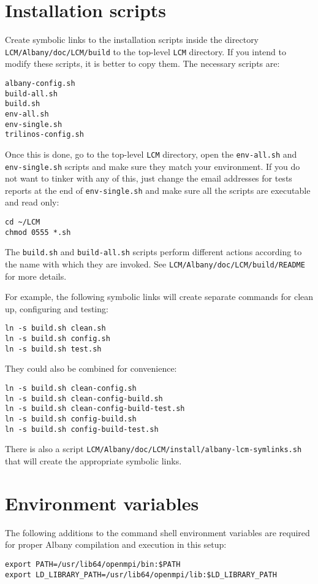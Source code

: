 \documentclass[10pt,a4paper]{article} \usepackage[utf8]{inputenc}
\begin{document}
\section{Installation scripts}
Create symbolic links to the installation scripts inside the directory
\verb+LCM/Albany/doc/LCM/build+ to the top-level \verb+LCM+
directory. If you intend to modify these scripts, it is better to copy
them. The necessary scripts are:
\begin{verbatim}
albany-config.sh
build-all.sh
build.sh
env-all.sh
env-single.sh
trilinos-config.sh
\end{verbatim}

Once this is done, go to the top-level \verb+LCM+ directory, open the
\verb+env-all.sh+ and \verb+env-single.sh+ scripts and make sure they
match your environment. If you do not want to tinker with any of this,
just change the email addresses for tests reports at the end of
\verb+env-single.sh+ and make sure all the scripts are executable and
read only:
\begin{verbatim}
cd ~/LCM
chmod 0555 *.sh
\end{verbatim}

The \verb+build.sh+ and \verb+build-all.sh+ scripts perform different
actions according to the name with which they are invoked. See
\verb+LCM/Albany/doc/LCM/build/README+ for more details. 

For example, the following symbolic links will create separate
commands for clean up, configuring and testing:
\begin{verbatim}
ln -s build.sh clean.sh
ln -s build.sh config.sh
ln -s build.sh test.sh
\end{verbatim}
They could also be combined for convenience:
\begin{verbatim}
ln -s build.sh clean-config.sh
ln -s build.sh clean-config-build.sh
ln -s build.sh clean-config-build-test.sh
ln -s build.sh config-build.sh
ln -s build.sh config-build-test.sh
\end{verbatim}
There is also a script
\verb+LCM/Albany/doc/LCM/install/albany-lcm-symlinks.sh+
that will create the appropriate symbolic links. 

\section{Environment variables}
The following additions to the command shell environment variables are
required for proper Albany compilation and execution in this setup:
\begin{verbatim}
export PATH=/usr/lib64/openmpi/bin:$PATH
export LD_LIBRARY_PATH=/usr/lib64/openmpi/lib:$LD_LIBRARY_PATH
\end{verbatim}
\end{document}
